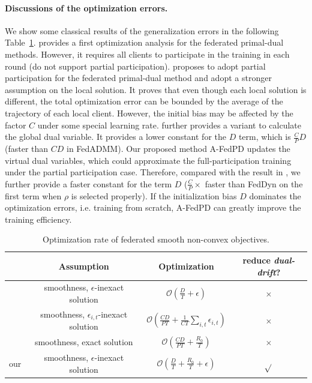 \paragraph{Discussions of the optimization errors.} 
\label{ap:opt discuss} We show some classical results of the generalization errors in the following Table~\ref{tb:opt comparison}. \citet{zhang2021fedpd} provides a first optimization analysis for the federated primal-dual methods. However, it requires all clients to participate in the training in each round (do not support partial participation). \citet{wang2022fedadmm,gong2022fedadmm} proposes to adopt partial participation for the federated primal-dual method and adopt a stronger assumption on the local solution. It proves that even though each local solution is different, the total optimization error can be bounded by the average of the trajectory of each local client. However, the initial bias may be affected by the factor $C$ under some special learning rate. \citet{durmus2021federated} further provides a variant to calculate the global dual variable. It provides a lower constant for the $D$ term, which is $\frac{C}{P}D$ (faster than $CD$ in FedADMM). Our proposed method A-FedPD updates the virtual dual variables, which could approximate the full-participation training under the partial participation case. Therefore, compared with the result in \citep{durmus2021federated}, we further provide a faster constant for the term $D$ ($\frac{C}{P}\times$ faster than FedDyn on the first term when $\rho$ is selected properly). If the initialization bias $D$ dominates the optimization errors, i.e. training from scratch, A-FedPD can greatly improve the training efficiency.
\begin{table}[H]
\centering
\caption{Optimization rate of federated smooth non-convex objectives.}
\label{tb:opt comparison}
\small
\begin{tabular}{cccc}
\toprule
& Assumption & Optimization & reduce \textit{dual-drift}? \\ 
\midrule
\citet{zhang2021fedpd} & smoothness, $\epsilon$-inexact solution & $\mathcal{O}(\frac{D}{T}+\epsilon)$ & $\times$ \\
\citet{hu2022generalization} & smoothness, $\epsilon_{i,t}$-inexact solution & $\mathcal{O}(\frac{CD}{PT}+\frac{1}{CT}\sum_{i,t}\epsilon_{i,t})$ & $\times$ \\
\citet{durmus2021federated} & smoothness, exact solution & $\mathcal{O}(\frac{CD}{PT}+\frac{R_0}{T})$ & $\times$ \\
\midrule
our & smoothness, $\epsilon$-inexact solution & $\mathcal{O}(\frac{D}{T}+\frac{R_0}{T} + \epsilon)$ & $\sqrt{}$ \\
\bottomrule
\end{tabular}
\end{table}

